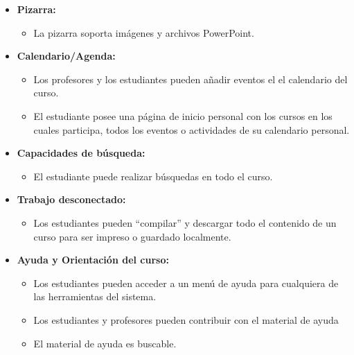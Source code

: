 	\begin{itemize}
		\item \textbf{Pizarra:}
			\begin{itemize}
				\item La pizarra soporta imágenes y archivos PowerPoint.
			\end{itemize}
	\end{itemize}
	\begin{itemize}
		\item \textbf{Calendario/Agenda:}
			\begin{itemize}
				\item Los profesores y los estudiantes pueden añadir eventos el el calendario del curso.
				\item El estudiante posee una página de inicio personal con los cursos en los cuales participa, todos los eventos o actividades de su calendario personal.
			\end{itemize}
	\end{itemize}
	\begin{itemize}
		\item \textbf{Capacidades de búsqueda:}
			\begin{itemize}
				\item El estudiante puede realizar búsquedas en todo el curso.
			\end{itemize}
	\end{itemize}
	\begin{itemize}
		\item \textbf{Trabajo desconectado:}
			\begin{itemize}
				\item Los estudiantes pueden ``compilar'' y descargar todo el contenido de un curso para ser impreso o guardado localmente.
			\end{itemize}
	\end{itemize}
	\begin{itemize}
		\item \textbf{Ayuda y Orientación del curso:}
			\begin{itemize}
				\item Los estudiantes pueden acceder a un menú de ayuda para cualquiera de las herramientas del sistema.
				\item Los estudiantes y profesores pueden contribuir con el material de ayuda
				\item El material de ayuda es buscable.
			\end{itemize}
	\end{itemize}
